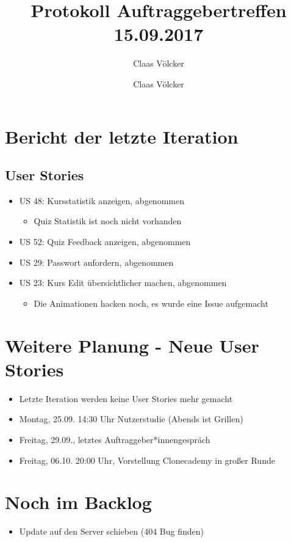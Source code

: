 \documentclass[colorback, accentcolor=tud1c, paper=a4]{tudexercise}
\title{Protokoll Auftraggebertreffen 15.09.2017}
\subtitle{Claas Völcker}
\author{Claas Völcker}
\begin{document}
\maketitle

\begin{multicols}{2}

\section*{Bericht der letzte Iteration}
\subsection*{User Stories}
\begin{itemize}
	\item US 48: Kursstatistik anzeigen, abgenommen
	\begin{itemize}
		\item Quiz Statistik ist noch nicht vorhanden
	\end{itemize}
	\item US 52: Quiz Feedback anzeigen, abgenommen
	\item US 29: Passwort anfordern, abgenommen
	\item US 23: Kurs Edit übersichtlicher machen, abgenommen
	\begin{itemize}
		\item Die Animationen hacken noch, es wurde eine Issue aufgemacht
	\end{itemize}
\end{itemize}

\section*{Weitere Planung - Neue User Stories}
\begin{itemize}
	\item Letzte Iteration werden keine User Stories mehr gemacht
	\item Montag, 25.09. 14:30 Uhr Nutzerstudie (Abends ist Grillen)
	\item Freitag, 29.09., letztes Auftraggeber*innengespräch
	\item Freitag, 06.10. 20:00 Uhr, Vorstellung Clonecademy in großer Runde
\end{itemize}

\section*{Noch im Backlog}
\begin{itemize}
	\item Update auf den Server schieben (404 Bug finden)
\end{itemize}

\end{multicols}
\end{document}
